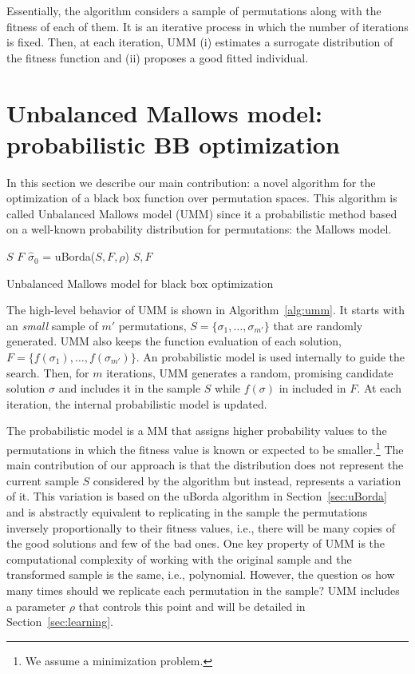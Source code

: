 \documentclass[runningheads]{llncs}
\begin{document}
Essentially, the algorithm  considers a sample of permutations along with the fitness of each of them. It is an iterative process in which the number of iterations is fixed. 
Then, at each iteration, UMM (i) estimates a surrogate distribution of the fitness function and (ii) proposes a good fitted individual. 


\section{Unbalanced Mallows model: probabilistic BB optimization}
In this section we describe our main contribution: a novel algorithm for the optimization of a black box function over permutation spaces. This algorithm is called Unbalanced Mallows model (UMM) since it a probabilistic method based on a well-known probability distribution for permutations: the Mallows model. 

\begin{algorithm}[t]
 $S$\;
 $F$\;
 $\hat\sigma_0$ = uBorda($S, F,\rho$)\;
 \Return $S, F$
 \caption{Unbalanced Mallows model for black box optimization}
 \label{alg:umm}
\end{algorithm}



The high-level behavior of UMM is shown in Algorithm~\ref{alg:umm}. It starts with an \textit{small} sample of $m'$ permutations, $S=\{\sigma_1, \ldots,  \sigma_{m'}\}$ that are randomly generated. UMM also keeps the function evaluation of each solution, $F=\{f(\sigma_1), \ldots, f(\sigma_{m'})\}$. An probabilistic model is used internally to guide the search. Then, for $m$ iterations, UMM generates a random, promising candidate solution $\sigma$ and includes it in the sample $S$ while $f(\sigma)$ in included in $F$. At each iteration, the internal probabilistic model is updated. 

The probabilistic model is a MM that assigns higher probability values to the permutations in which the fitness value is known or expected to be smaller.\footnote{We assume a minimization problem.} The main contribution of our approach is that the distribution does not represent the current sample $S$ considered by the algorithm but instead, represents a variation of it. This variation is based on the uBorda algorithm in Section~\ref{sec:uBorda} and is abstractly equivalent to replicating in the sample the permutations inversely proportionally to their fitness values, i.e., there will be many copies of the good solutions and few of the bad ones. One key property of UMM is the computational complexity of working with the original sample and the transformed sample is the same, i.e., polynomial. However, the question os how many times should we replicate each permutation in the sample? UMM includes a parameter $\rho$ that controls this point and will be detailed in Section~\ref{sec:learning}.
\end{document}
